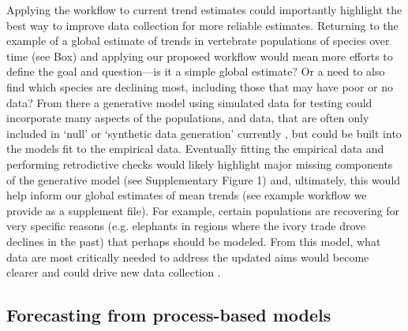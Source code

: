 \documentclass[11pt]{article}
\newcommand{\llabel}[1]{\hypertarget{lintarget:#1}{}\linelabel{lin:#1}}
\begin{document}
Applying the workflow to current trend estimates could importantly highlight the best way to improve data collection for more reliable estimates. Returning to the example of a global estimate of trends in vertebrate populations of species over time (see Box) and applying our proposed workflow would mean more efforts to define the goal and question---is it a simple global estimate?
Or a need to also find which species are declining most, including those that may have poor or no data? From there a generative model using simulated data for testing could incorporate many aspects of the populations, and data, that are often only included in `null' or `synthetic data generation' currently \citep{Buschke2021,mcrae2025utility}, but could be built into the models fit to the empirical data. Eventually fitting the empirical data and performing retrodictive checks would likely highlight major missing components of the generative model \llabel{suppfig4}(see Supplementary Figure 1) and, ultimately, this would help inform our global estimates of mean trends \llabel{exampleworkflow2}(see example workflow we provide as a supplement file). For example, certain populations are recovering for very specific reasons (e.g. elephants in regions where the ivory trade drove declines in the past) that perhaps should be modeled. From this model, what data are most critically needed to address the updated aims would become clearer and could drive new data collection \citep{toszogyova2024mathematical}. 

\subsection{Forecasting from process-based models}
\end{document}
